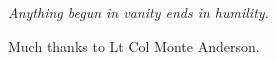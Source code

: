 \begin{acknowledgements}

\begin{center}
      \emph{Anything begun in vanity ends in humility.}
\end{center}
 
Much thanks to Lt Col Monte Anderson.  

\end{acknowledgements}



